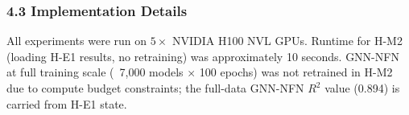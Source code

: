 \subsubsection{4.3 Implementation Details}

\begin{table}[htbp]
\centering
{}
\end{table}

All experiments were run on $5\times$ NVIDIA H100 NVL GPUs. Runtime for H-M2 (loading H-E1 results, no retraining) was approximately 10 seconds. GNN-NFN at full training scale (~7,000 models $\times$ 100 epochs) was not retrained in H-M2 due to compute budget constraints; the full-data GNN-NFN $R^2$ value (0.894) is carried from H-E1 state.

